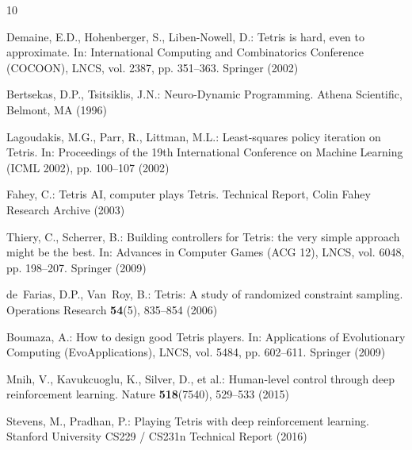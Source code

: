 \documentclass[runningheads]{llncs}
\begin{document}


\begin{thebibliography}{10}

Demaine, E.D., Hohenberger, S., Liben-Nowell, D.: Tetris is hard, even to approximate. In: International Computing and Combinatorics Conference (COCOON), LNCS, vol. 2387, pp. 351--363. Springer (2002)

Bertsekas, D.P., Tsitsiklis, J.N.: Neuro-Dynamic Programming. Athena Scientific, Belmont, MA (1996)

Lagoudakis, M.G., Parr, R., Littman, M.L.: Least-squares policy iteration on Tetris. In: Proceedings of the 19th International Conference on Machine Learning (ICML 2002), pp. 100--107 (2002)

Fahey, C.: Tetris AI, computer plays Tetris. Technical Report, Colin Fahey Research Archive (2003)

Thiery, C., Scherrer, B.: Building controllers for Tetris: the very simple approach might be the best. In: Advances in Computer Games (ACG 12), LNCS, vol. 6048, pp. 198--207. Springer (2009)

de~Farias, D.P., Van~Roy, B.: Tetris: A study of randomized constraint sampling. Operations Research \textbf{54}(5), 835--854 (2006)

Boumaza, A.: How to design good Tetris players. In: Applications of Evolutionary Computing (EvoApplications), LNCS, vol. 5484, pp. 602--611. Springer (2009)

Mnih, V., Kavukcuoglu, K., Silver, D., et al.: Human-level control through deep reinforcement learning. Nature \textbf{518}(7540), 529--533 (2015)

Stevens, M., Pradhan, P.: Playing Tetris with deep reinforcement learning. Stanford University CS229 / CS231n Technical Report (2016)


\end{thebibliography}
\end{document}
